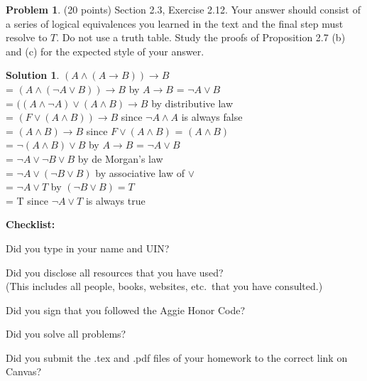 \documentclass{article}
\theoremstyle{definition}
\newtheorem{problem}{Problem}
\newtheorem*{solution}{Solution}
\newcommand{\checklist}{\noindent\textbf{Checklist:}
\begin{compactitem}[$\Box$] 
\item Did you type in your name and UIN? 
\item Did you disclose all resources that you have used? \\
(This includes all people, books, websites, etc.\ that you have consulted.)
\item Did you sign that you followed the Aggie Honor Code? 
\item Did you solve all problems? 
\item Did you submit the .tex and .pdf files of your homework to the correct link on Canvas? 
\end{compactitem}
}
\begin{document}
\begin{problem} (20 points) Section 2.3, Exercise 2.12.
Your answer should consist of a series of logical equivalences 
you learned in the text and the final step must resolve to $T$.
Do not use a truth table.  Study the proofs of Proposition 2.7 (b) and (c) 
for the expected style of your answer.
\end{problem}
\begin{solution} 
$(A \land (A \to B)) \to B$ \\
= $(A \land (\lnot A \lor B)) \to B$ by $A \to B$ = $\lnot A \lor B$ \\
= $((A \land \lnot A) \lor (A \land B) \to B$ by distributive law \\
= $(F \lor (A \land B)) \to B$ since $\lnot A \land A$ is always false \\
= $(A \land B) \to B$ since $F \lor (A \land B)$ = $(A \land B)$ \\
= $\lnot(A \land B) \lor B$ by $A \to B$ = $\lnot A \lor B$ \\
= $\lnot A \lor \lnot B \lor B$ by de Morgan's law \\
= $\lnot A \lor (\lnot B\lor B)$ by associative law of $\lor$ \\
= $\lnot A \lor T$ by $(\lnot B\lor B) = T$ \\
= T since $\lnot A \lor T$ is always true

\end{solution}

\goodbreak
\checklist
\end{document}
